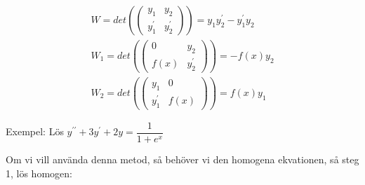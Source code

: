 \begin{equation*}
  \begin{gathered}
    W = det\left(\begin{pmatrix}y_1&y_2\\y_1^{\prime}&y_2^{\prime}\end{pmatrix}\right) = y_1y_2^{\prime}-y_1^{\prime}y_2\\
    W_1 = det\left(\begin{pmatrix}0&y_2\\f(x)&y_2^{\prime}
    \end{pmatrix}\right) = -f(x)y_2\\
        W_2 = det\left(\begin{pmatrix}y_1&0\\y_1^{\prime}&f(x)\end{pmatrix}\right) = f(x)y_1
  \end{gathered}
\end{equation*}
\par\bigskip
\noindent Exempel: Lös $y^{\prime\prime}+3y^{\prime}+2y=\dfrac{1}{1+e^x}$
\par\bigskip
\noindent Om vi vill använda denna metod, så behöver vi den homogena ekvationen, så steg 1, lös homogen:


